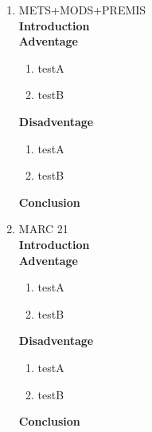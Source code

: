 \begin{enumerate}
	\item METS+MODS+PREMIS\\
	{\bf Introduction}\\
	
	{\bf Adventage}
	\begin{enumerate}
		\item testA
		\item testB
	\end{enumerate}	
	{\bf Disadventage}
	\begin{enumerate}
		\item testA
		\item testB
	\end{enumerate}
	{\bf Conclusion}\\
	
	\item MARC 21\\
	{\bf Introduction}\\
	
	{\bf Adventage}
	\begin{enumerate}
		\item testA
		\item testB	
	\end{enumerate}	
	{\bf Disadventage}
	\begin{enumerate}
		\item testA
		\item testB
	\end{enumerate}
	{\bf Conclusion}\\
	

\end{enumerate}
